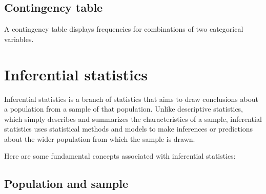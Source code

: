 \documentclass[
]{book}
\newenvironment{Shaded}{\begin{snugshade}}{\end{snugshade}}
\newcommand{\CommentTok}[1]{\textcolor[rgb]{0.56,0.35,0.01}{\textit{#1}}}
\newcommand{\DecValTok}[1]{\textcolor[rgb]{0.00,0.00,0.81}{#1}}
\newcommand{\FunctionTok}[1]{\textcolor[rgb]{0.13,0.29,0.53}{\textbf{#1}}}
\newcommand{\NormalTok}[1]{#1}
\newcommand{\SpecialCharTok}[1]{\textcolor[rgb]{0.81,0.36,0.00}{\textbf{#1}}}
\begin{document}
\hypertarget{contingency-table}{%
\section{Contingency table}\label{contingency-table}}

A contingency table displays frequencies for combinations of two categorical variables.

\begin{Shaded}
\end{Shaded}

\hypertarget{inferential-statistics}{%
\chapter{Inferential statistics}\label{inferential-statistics}}

Inferential statistics is a branch of statistics that aims to draw conclusions about a population from a sample of that population. Unlike descriptive statistics, which simply describes and summarizes the characteristics of a sample, inferential statistics uses statistical methods and models to make inferences or predictions about the wider population from which the sample is drawn.

Here are some fundamental concepts associated with inferential statistics:

\hypertarget{population-and-sample}{%
\section{Population and sample}\label{population-and-sample}}
\end{document}
